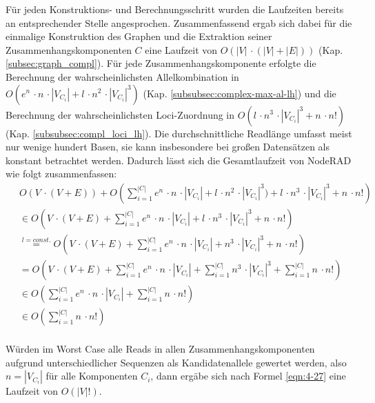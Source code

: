 Für jeden Konstruktions- und Berechnungsschritt wurden die Laufzeiten bereits an entsprechender Stelle angesprochen. Zusammenfassend ergab sich dabei für die einmalige Konstruktion des Graphen und die Extraktion seiner Zusammenhangskomponenten $ C $ eine Laufzeit von $O(|V| \, \cdotp (|V| + |E|)) $ (Kap. \ref{subsec:graph_compl}). Für jede Zusammenhangskomponente erfolgte die Berechnung der wahrscheinlichsten Allelkombination in $ O( e^n\, \cdotp n\, \cdotp |V_{C_{i}}| + l\, \cdotp n^2\, \cdotp |V_{C_{i}}|^3) $ (Kap. \ref{subsubsec:complex-max-al-lh}) und die Berechnung der wahrscheinlichsten Loci-Zuordnung in $O( l\, \cdotp n^3  \, \cdotp |V_{C_{i}}|^3 + n  \, \cdotp n!)$ (Kap. \ref{subsubsec:compl_loci_lh}). Die durchschnittliche Readlänge umfasst meist nur wenige hundert Basen, sie kann insbesondere bei großen Datensätzen als konstant betrachtet werden. Dadurch lässt sich die Gesamtlaufzeit von NodeRAD wie folgt zusammenfassen:
\begin{equation} \label{eqn:4-26}
\tag{4-26}
\begin{aligned}
&\ {}O(V \, \cdotp (V + E)) + O\left( \sum_{i=1}^{|C|} e^n\, \cdotp n\, \cdotp |V_{C_{i}}| + l\, \cdotp n^2\, \cdotp |V_{C_{i}}|^3) + l\, \cdotp n^3  \, \cdotp |V_{C_{i}}|^3 + n  \, \cdotp n! \right) \\
&\ \in O\left( V \, \cdotp (V + E) + \sum_{i=1}^{|C|} e^n\, \cdotp n\, \cdotp |V_{C_{i}}| + l\, \cdotp n^3  \, \cdotp |V_{C_{i}}|^3 + n  \, \cdotp n! \right) \\
&\ \stackrel{l = const.}{=} O\left( V \, \cdotp (V + E) + \sum_{i=1}^{|C|} e^n\, \cdotp n\, \cdotp |V_{C_{i}}| + n^3  \, \cdotp |V_{C_{i}}|^3 + n  \, \cdotp n! \right) \\
&\ = O\left( V \, \cdotp (V + E) + \sum_{i=1}^{|C|} e^n\, \cdotp n\, \cdotp |V_{C_{i}}| + \sum_{i=1}^{|C|} n^3  \, \cdotp |V_{C_{i}}|^3 + \sum_{i=1}^{|C|} n  \, \cdotp n! \right) \\
&\ \in O\left(\sum_{i=1}^{|C|} e^n\, \cdotp n\, \cdotp |V_{C_{i}}| + \sum_{i=1}^{|C|} n  \, \cdotp n! \right) \\
&\ \in O\left(\sum_{i=1}^{|C|} n  \, \cdotp n! \right) \\
\end{aligned}
\end{equation}

Würden im Worst Case alle Reads in allen Zusammenhangskomponenten aufgrund unterschiedlicher Sequenzen als Kandidatenallele gewertet werden, also $n = |V_{C_{i}}|$ für alle Komponenten $C_{i}$, dann ergäbe sich nach Formel \eqref{eqn:4-27} eine Laufzeit von $O(|V|!)$. 

